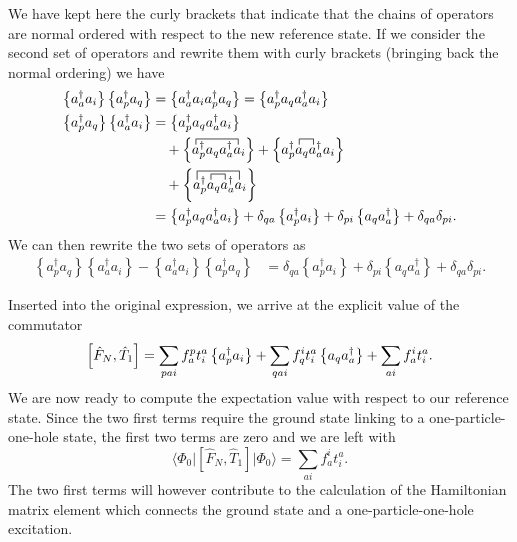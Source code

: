 We have kept here the curly brackets that indicate that the chains of operators are normal ordered with respect to the new reference state. 
If we consider the second set of operators and rewrite them with curly brackets (bringing back the normal ordering) we have
        \begin{align*}
            \left\{a_a^\dagger a_i\right\} \left\{a_p^\dagger a_q \right\} &= \normord{a_a^\dagger a_i a_p^\dagger a_q}
                = \normord{a_p^\dagger a_q a_a^\dagger a_i} \\ 
        \normord{a_p^\dagger a_q}\normord{a_a^\dagger a_i} &= \normord{a_p^\dagger a_q a_a^\dagger a_i}  \\
            & \quad + \normord{
               \contraction{}{a}{{}^\dagger_pa_q a^\dagger_a}{a}
                a^\dagger_p a_q a^\dagger_a a_i} +
            \normord{
                \contraction{a^\dagger_p}{a}{{}_q}{a}
                a^\dagger_p a_q a^\dagger_a a_i} \\ 
            & \quad + \normord{
                \contraction[1.5ex]{}{a}{{}^\dagger_pa_q a^\dagger_a}{a}
                \contraction{a^\dagger_p}{a}{{}_q}{a}
                a^\dagger_p a_q a^\dagger_a a_i} \\ 
            &=  \normord{a_p^\dagger a_q a_a^\dagger a_i} + \delta_{qa} \normord{a_p^\dagger a_i} + \delta_{pi} \normord{a_q a_a^\dagger}
            + \delta_{qa}\delta_{pi}.
        \end{align*}
We can then rewrite the two sets of operators as
        \begin{align*}
            \left\{a_p^\dagger a_q \right\}\left\{a_a^\dagger a_i\right\} - \left\{a_a^\dagger a_i\right\} \left\{a_p^\dagger a_q \right\} &= \delta_{qa} \left\{ a_p^\dagger a_i\right\} + \delta_{pi} \left\{ a_q a_a^\dagger \right\} + \delta_{qa}\delta_{pi}.
    \end{align*}

        Inserted into the original expression, we arrive at the explicit value of the commutator
        \[
        \left[ \hat{F}_N, \hat{T}_1 \right] = \sum_{pai} f_a^p t_i^a \left\{a_p^\dagger a_i\right\} + 
                \sum_{qai} f_q^i t_i^a \left\{a_q a_a^\dagger\right\} + \sum_{ai} f_a^i t_i^a.
        \]
We are now ready to compute the expectation value with respect to our reference state. Since the two first terms require the ground state linking to 
a one-particle-one-hole state, the first two terms are zero and we are left with 
\begin{equation}\label{eq:firsttermE}
\langle \Phi_0 \vert \left[ \hat{F}_N, \hat{T}_1 \right] \vert \Phi_0\rangle = \sum_{ai} f_a^i t_i^a.
\end{equation}
The two first terms will however contribute to the calculation of the Hamiltonian  matrix element which connects the ground state and a one-particle-one-hole excitation. 
  
